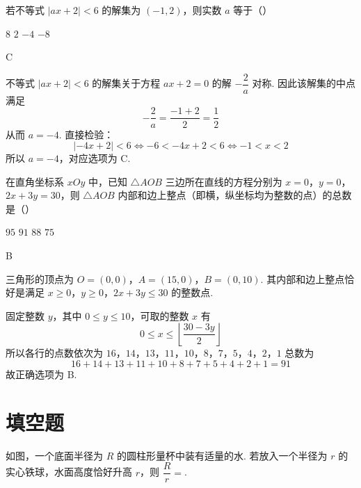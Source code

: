 \begin{problem}
若不等式 \(|ax+2|<6\) 的解集为 \((-1,2)\)，则实数 \(a\) 等于（\quad）

\choices
    {\(8\)}
    {\(2\)}
    {\(-4\)}
    {\(-8\)}
\end{problem}

\begin{answer}
C
\end{answer}

\begin{solution}
不等式 \(|ax+2|<6\) 的解集关于方程 \(ax+2=0\) 的解 \(-\dfrac2a\) 对称. 因此该解集的中点满足
\[
-\dfrac2a=\dfrac{-1+2}{2}=\dfrac12
\]
从而 \(a=-4\). 直接检验：
\[
|-4x+2|<6
\Longleftrightarrow -6<-4x+2<6
\Longleftrightarrow -1<x<2
\]
所以 \(a=-4\)，对应选项为 C.
\end{solution}

\begin{problem}
在直角坐标系 \(xOy\) 中，已知 \(\triangle AOB\) 三边所在直线的方程分别为 \(x=0\)，\(y=0\)，\(2x+3y=30\)，则 \(\triangle AOB\) 内部和边上整点（即横，纵坐标均为整数的点）的总数是（\quad）

\choices
    {\(95\)}
    {\(91\)}
    {\(88\)}
    {\(75\)}
\end{problem}

\begin{answer}
B
\end{answer}

\begin{solution}
三角形的顶点为 \(O=(0,0)\)，\(A=(15,0)\)，\(B=(0,10)\). 其内部和边上整点恰好是满足
\(x\geqslant0\)，\(y\geqslant0\)，\(2x+3y\leqslant30\)
的整数点.

固定整数 \(y\)，其中 \(0\leqslant y\leqslant10\)，可取的整数 \(x\) 有
\[
0\leqslant x\leqslant\left\lfloor\dfrac{30-3y}{2}\right\rfloor
\]
所以各行的点数依次为
\(16\)，\(14\)，\(13\)，\(11\)，\(10\)，\(8\)，\(7\)，\(5\)，\(4\)，\(2\)，\(1\)
总数为
\[
16+14+13+11+10+8+7+5+4+2+1=91
\]
故正确选项为 B.
\end{solution}

\section{填空题}
\begin{problem}
如图，一个底面半径为 \(R\) 的圆柱形量杯中装有适量的水. 若放入一个半径为 \(r\) 的实心铁球，水面高度恰好升高 \(r\)，则 \(\dfrac Rr=\)\fillinblank{}.

\end{problem}


